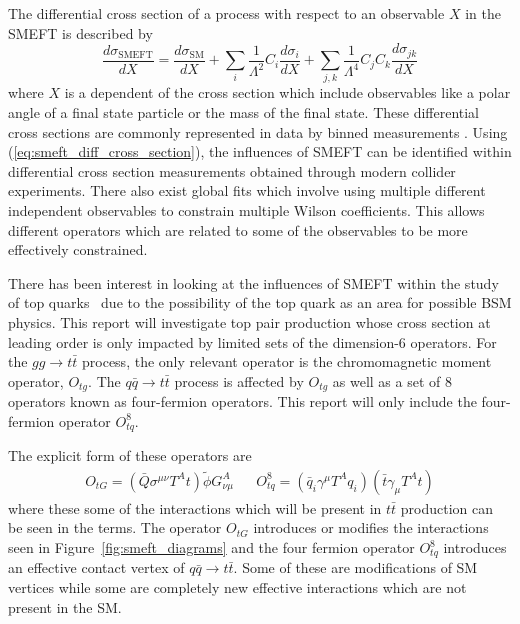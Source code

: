 \documentclass[a4paper,11pt]{article}
\begin{document}
The differential cross section of a process with respect to an observable $X$ in the SMEFT is described by
\begin{equation}\label{eq:smeft_diff_cross_section}
    \frac{d\sigma_{\text{SMEFT}}}{dX} = \frac{d\sigma_{\text{SM}}}{dX} + \sum\limits_{i} \frac{1}{\Lambda^2} C_{i} \frac{d\sigma_{i}}{dX} + \sum\limits_{j,k} \frac{1}{\Lambda^4} C_{j} C_{k} \frac{d\sigma_{j k}}{dX}
\end{equation}
where $X$ is a dependent of the cross section which include observables like a polar angle of a final state particle or the mass of the final state.
These differential cross sections are commonly represented in data by binned measurements .
Using (\ref{eq:smeft_diff_cross_section}), the influences of SMEFT can be identified within differential cross section measurements obtained through modern collider experiments.
There also exist global fits which involve using multiple different independent observables to constrain multiple Wilson coefficients.
This allows different operators which are related to some of the observables to be more effectively constrained.

There has been interest in looking at the influences of SMEFT within the study of top quarks~\cite{Hartland_2019,Buckley_2015,Brivio_2020} due to the possibility of the top quark as an area for possible BSM physics.
This report will investigate top pair production whose cross section at leading order is only impacted by limited sets of the dimension-6 operators. For the $gg \rightarrow t\bar{t}$ process, the only relevant operator is the chromomagnetic moment operator, $O_{tg}$.
The $q\bar{q} \rightarrow t\bar{t}$ process is affected by $O_{tg}$ as well as a set of 8 operators known as four-fermion operators.
This report will only include the four-fermion operator $O_{tq}^{8}$.

The explicit form of these operators are
\begin{align*}
    O_{tG} = (\bar{Q} \sigma^{\mu \nu} T^{A} t) \tilde{\phi} G^{A}_{\nu \mu} && O_{tq}^{8} = (\bar{q}_{i} \gamma^{\mu} T^{A} q_{i})(\bar{t} \gamma_{\mu} T^{A} t)
\end{align*}
where these some of the interactions which will be present in $t\bar{t}$ production can be seen in the terms.
The operator $O_{tG}$ introduces or modifies the interactions seen in Figure~\ref{fig:smeft_diagrams} and the four fermion operator $O_{tq}^{8}$ introduces an effective contact vertex of $q\bar{q} \rightarrow t\bar{t}$.
Some of these are modifications of SM vertices while some are completely new effective interactions which are not present in the SM.
\end{document}
